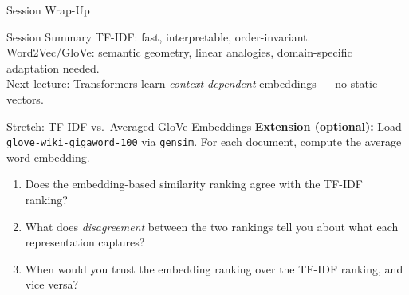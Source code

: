 \documentclass[9pt,t]{beamer}
\begin{document}
\begin{frame}{Session Wrap-Up}
  \begin{block}{Session Summary}
    TF-IDF: fast, interpretable, order-invariant.\\
    Word2Vec/GloVe: semantic geometry, linear analogies, domain-specific adaptation needed.\\
    Next lecture: Transformers learn \emph{context-dependent} embeddings --- no static vectors.
  \end{block}
\end{frame}


\begin{frame}[noframenumbering]{Stretch: TF-IDF vs.\ Averaged GloVe Embeddings}
  \textbf{Extension (optional):} Load \texttt{glove-wiki-gigaword-100} via \texttt{gensim}.
  For each document, compute the average word embedding.
  \medskip
  \begin{enumerate}
    \item Does the embedding-based similarity ranking agree with the TF-IDF ranking?
    \item What does \emph{disagreement} between the two rankings tell you about
          what each representation captures?
    \item When would you trust the embedding ranking over the TF-IDF ranking,
          and vice versa?
  \end{enumerate}
\end{frame}
\end{document}
